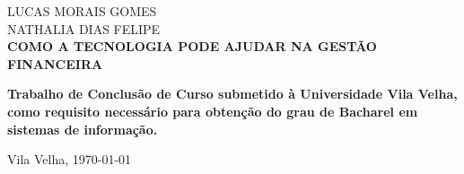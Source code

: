 
\begin{center}

    {\large LUCAS MORAIS GOMES \\ NATHALIA DIAS FELIPE\\}
    \vspace{8cm}
    {\Large \textsc\textbf{{COMO A TECNOLOGIA PODE AJUDAR NA GESTÃO FINANCEIRA} }\\}
    \vspace{1cm}
    \hspace{.45\linewidth}
    \begin{minipage}{.50\linewidth}

            \textbf{Trabalho de Conclusão de Curso submetido à Universidade Vila Velha,  como requisito 
            necessário para obtenção do grau de Bacharel em sistemas de informação. }

           
    
    \end{minipage}

    \vspace{2cm}
    \vfill
    {\large Vila Velha, \today{}}
\end{center}

